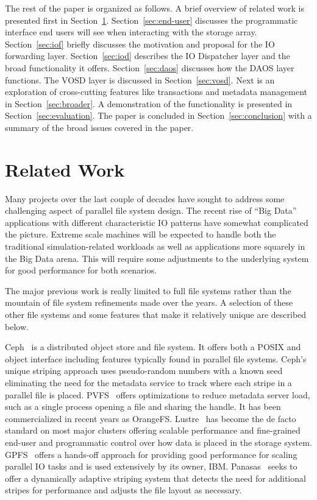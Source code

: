 \documentclass{sig-alt-gov2}
\begin{document}
The rest of the paper is organized as follows. A brief overview of related work
is presented first in Section~\ref{sec:related}. Section~\ref{sec:end-user}
discusses the programmatic interface end users will see when interacting with
the storage array.
Section~\ref{sec:iof}
briefly discusses the motivation and proposal for the IO forwarding layer.
Section~\ref{sec:iod} describes the IO Dispatcher layer and the broad
functionality it offers.
Section~\ref{sec:daos} discusses how the DAOS
layer functions.
The VOSD layer is discussed in Section~\ref{sec:vosd}.
Next is an exploration of cross-cutting features like transactions and
metadata management in Section~\ref{sec:broader}.
A demonstration of the functionality is presented in
Section~\ref{sec:evaluation}.
The paper is concluded in
Section~\ref{sec:conclusion} with a summary of the broad issues covered in the
paper.

\section{Related Work}
\label{sec:related}

Many projects over the last couple of decades have sought to address some
challenging aspect of parallel file system design. The recent rise of ``Big
Data'' applications with different characteristic IO patterns have somewhat
complicated the picture. Extreme scale machines will be expected to handle both
the traditional simulation-related workloads as well as applications more
squarely in the Big Data arena. This will require some adjustments to the
underlying system for good performance for both scenarios.

The major previous work is really limited to full file systems rather than the
mountain of file system refinements made over the years. A selection of these
other file systems and some features that make it relatively unique are
described below.

Ceph~\cite{weil:ceph} is a distributed object store and file system. It offers
both a POSIX and object interface including features typically found in parallel
file systems.
Ceph's unique striping approach uses pseudo-random numbers with a
known seed eliminating the need for the metadata service to track where each
stripe in a parallel file is placed.
PVFS~\cite{carns:pvfs} offers optimizations to reduce metadata server load,
such as a single process opening a file and sharing the handle.
It has been
commercialized in recent years as OrangeFS.
Lustre~\cite{braam:lustre-arch} has become the de facto standard on most major
clusters offering scalable performance and fine-grained end-user and
programmatic control over how data is placed in the storage system.
GPFS~\cite{schmuck:gpfs} offers a hands-off approach for providing good
performance for scaling parallel IO tasks and is used extensively by its owner,
IBM.
Panasas~\cite{panasas:architecture} seeks to offer a dynamically adaptive
striping system that detects the need for additional stripes for performance
and adjusts the file layout as necessary.
\end{document}
